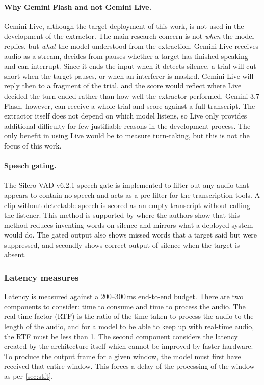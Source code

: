   \paragraph{Why Gemini Flash and not Gemini Live.}
  \label{sec:flash}
  Gemini Live, although the target deployment of this work, is not used in the development of the extractor. The main research concern is not \emph{when} the model replies, but \emph{what} the model understood from the extraction. Gemini Live receives audio as a stream, decides from pauses whether a target has finished speaking and can interrupt. Since it ends the input when it detects silence, a trial will cut short when the target pauses, or when an interferer is masked. Gemini Live will reply then to a fragment of the trial, and the score would reflect where Live decided the turn ended rather than how well the extractor performed. Gemini 3.7 Flash, however, can receive a whole trial and score against a full transcript. The extractor itself does not depend on which model listens, so Live only provides additional difficulty for few justifiable reasons in the development process. The only benefit in using Live would be to measure turn-taking, but this is not the focus of this work. 

  \paragraph{Speech gating.}
  \label{sec:speech_gate}
  The Silero VAD v6.2.1 \cite{silero2021vad} speech gate is implemented to filter out any audio that appears to contain no speech and acts as a pre-filter for the transcription tools. A clip without detectable speech is scored as an empty transcript without calling the listener. This method is supported by \cite{whisper_hallucination_2025} where the authors show that this method reduces inventing words on silence and mirrors what a deployed system would do. The gated output also shows missed words that a target said but were suppressed, and secondly shows correct output of silence when the target is absent.
  
  \subsubsection{Latency measures}
  Latency is measured against a 200--300\,ms end-to-end budget. There are two components to consider: time to consume and time to process the audio. The real-time factor (RTF) is the ratio of the time taken to process the audio to the length of the audio, and for a model to be able to keep up with real-time audio, the RTF must be less than 1. The second component considers the latency created by the architecture itself which cannot be improved by faster hardware. To produce the output frame for a given window, the model must first have received that entire window. This forces a delay of the processing of the window as per \autoref{sec:stft}. 
